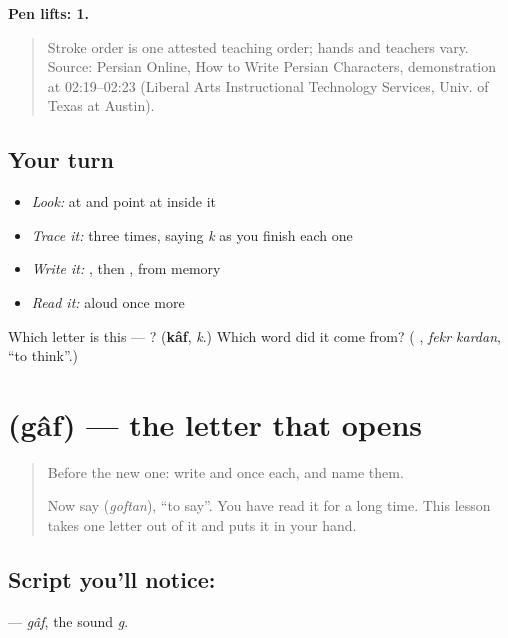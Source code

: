 \textbf{Pen lifts: 1.}

\begin{quote}
Stroke order is one attested teaching order; hands and teachers vary. Source: Persian Online, How to Write Persian Characters,  demonstration at 02:19–02:23 (Liberal Arts Instructional Technology Services, Univ. of Texas at Austin).
\end{quote}

\subsection*{Your turn}
\begin{itemize}
\raggedright
  \item \emph{Look:} at \textbf{ } and point at  inside it
  \item \emph{Trace it:}  three times, saying \emph{k} as you finish each one
  \item \emph{Write it:} , then , from memory
  \item \emph{Read it:} \textbf{ } aloud once more
\end{itemize}

\begin{tcolorbox}[breakable,colback=teal!4,colframe=teal!35!black,title={Before you move on}]
Which letter is this — ? (\textbf{kâf}, \emph{k}.) Which word did it come from? (\textbf{ }, \emph{fekr kardan}, \textquotedblleft{}to think\textquotedblright{}.)
\end{tcolorbox}
\section[\texorpdfstring{\fa{گ} (gâf)}{گ (gâf)}]{ (gâf) — the letter that opens }

\label{lesson:FA-W24-gaf}



\begin{quote}
Before the new one: write  and  once each, and name them.

Now say \textbf{} (\emph{goftan}), \textquotedblleft{}to say\textquotedblright{}. You have read it for a long time. This lesson takes one letter out of it and puts it in your hand.
\end{quote}

\subsection*{Script you'll notice: }
\textbf{} — \emph{gâf}, the sound \emph{g}.

